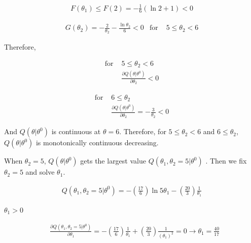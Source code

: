 \documentclass{article}
\begin{document}
\begin{equation}
\begin{aligned}
F(\theta_1) \leq F(2) = -\frac{1}{6}(\ln2 +1) <0
\end{aligned}
\end{equation}

\begin{equation}
\begin{aligned}
G(\theta_2) = -\frac{2}{\theta_2}- \frac{\ln \theta_2}{6} < 0 & \mbox{for } & 5 \leq \theta_2 <6
\end{aligned}
\end{equation}

Therefore,

\begin{equation}
\begin{aligned}
\mbox{for }   & 5 \leq \theta_2 <6 \\
& \frac{\partial Q(\theta | \theta^{0})}{ \partial \theta_2 } < 0
\end{aligned}
\end{equation}

\begin{equation}
\begin{aligned}
\mbox{for }   & 6 \leq \theta_2  \\
& \frac{\partial Q(\theta | \theta^{0})}{ \partial \theta_2 } = -\frac{3}{\theta_2} < 0
\end{aligned}
\end{equation}

And $Q(\theta | \theta^{0})$ is continuous at $\theta=6$. Therefore, for $5 \leq \theta_2 <6$ and $6 \leq \theta_2 $, $Q(\theta | \theta^{0})$ is monotonically continuous decreasing. 

When $\theta_2 = 5$, $Q(\theta | \theta^{0})$ gets the largest value $Q(\theta_1,\theta_2 = 5 | \theta^{0})$ . Then we fix $\theta_2 = 5$ and solve $\theta_1$. 

\begin{equation}
\begin{aligned}
Q(\theta_1,\theta_2 = 5 | \theta^{0}) = -(\frac{17}{6})\ln{5\theta_1} -(\frac{20}{3}) \frac{1}{\theta_1}
\end{aligned}
\end{equation}

$\theta_1 > 0$

\begin{equation}
\begin{aligned}
& \frac{\partial Q(\theta_1,\theta_2 = 5 | \theta^{0})}{ \partial \theta_1 } = -(\frac{17}{6})\frac{1}{\theta_1} + (\frac{20}{3}) \frac{1}{(\theta_1)^2} = 0 \rightarrow \theta_1 = \frac{40}{17}
\end{aligned}
\end{equation}
\end{document}
